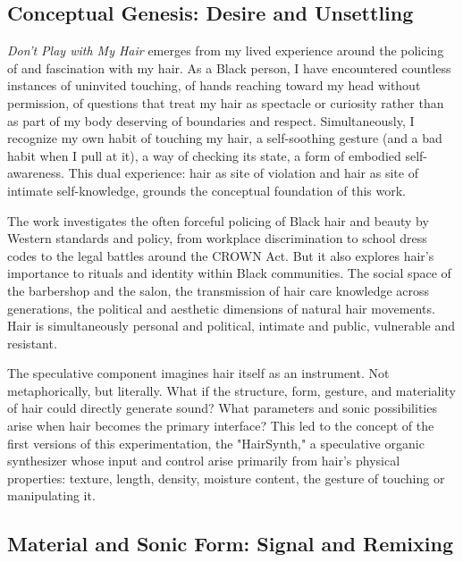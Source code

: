\subsection{Conceptual Genesis: Desire and Unsettling}

\emph{Don't Play with My Hair} emerges from my lived experience around the policing of and fascination with my hair. As a Black person, I have encountered countless instances of uninvited touching, of hands reaching toward my head without permission, of questions that treat my hair as spectacle or curiosity rather than as part of my body deserving of boundaries and respect. Simultaneously, I recognize my own habit of touching my hair, a self-soothing gesture (and a bad habit when I pull at it), a way of checking its state, a form of embodied self-awareness. This dual experience: hair as site of violation and hair as site of intimate self-knowledge, grounds the conceptual foundation of this work.

The work investigates the often forceful policing of Black hair and beauty by Western standards and policy, from workplace discrimination to school dress codes to the legal battles around the CROWN Act. But it also explores hair's importance to rituals and identity within Black communities. The social space of the barbershop and the salon, the transmission of hair care knowledge across generations, the political and aesthetic dimensions of natural hair movements. Hair is simultaneously personal and political, intimate and public, vulnerable and resistant.

The speculative component imagines hair itself as an instrument. Not metaphorically, but literally. What if the structure, form, gesture, and materiality of hair could directly generate sound? What parameters and sonic possibilities arise when hair becomes the primary interface? This led to the concept of the first versions of this experimentation, the "HairSynth," a speculative organic synthesizer whose input and control arise primarily from hair's physical properties: texture, length, density, moisture content, the gesture of touching or manipulating it.

\subsection{Material and Sonic Form: Signal and Remixing}

